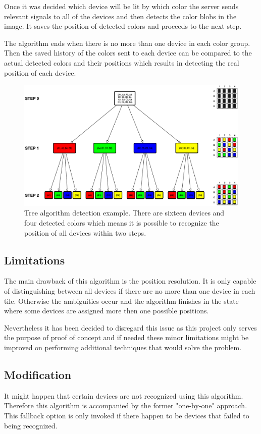 Once it was decided which device will be lit by which color the server sends relevant signals to all of the devices and then detects the color blobs in the image. It saves the position of detected colors and proceeds to the next step.

The algorithm ends when there is no more than one device in each color group. Then the saved history of the colors sent to each device can be compared to the actual detected colors and their positions which results in detecting the real position of each device.

\begin{figure}[H]
	\centering
		\includegraphics[width=21cm, angle=90]{sprint5/tree_algorithm.eps}
	\caption[Tree algorithm detection example]{Tree algorithm detection example. There are sixteen devices and four detected colors which means it is possible to recognize the position of all devices within two steps.}
	\label{fig:sprint5_tree_alg}
\end{figure}

\subsection{Limitations}
The main drawback of this algorithm is the position resolution. It is only capable of distinguishing between all devices if there are no more than one device in each tile. Otherwise the ambiguities occur and the algorithm finishes in the state where some devices are assigned more then one possible positions.

Nevertheless it has been decided to disregard this issue as this project only serves the purpose of proof of concept and if needed these minor limitations might be improved on performing additional techniques that would solve the problem.

\subsection{Modification}
It might happen that certain devices are not recognized using this algorithm. Therefore this algorithm is accompanied by the former "one-by-one" approach. This fallback option is only invoked if there happen to be devices that failed to being recognized.

